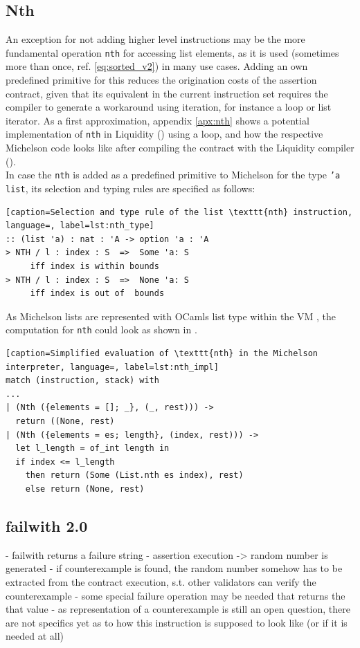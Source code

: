 \subsection{Nth}
An exception for not adding higher level instructions may be the more fundamental operation \texttt{nth} for accessing list elements, as it is used (sometimes more than once, ref. \eqref{eq:sorted_v2}) in many use cases. Adding an own predefined primitive for this reduces the origination costs of the assertion contract, given that its equivalent in the current instruction set requires the compiler to generate a workaround using iteration, for instance a loop or list iterator. As a first approximation, appendix \ref{apx:nth} shows a potential implementation of \texttt{nth} in Liquidity () using a loop, and how the respective Michelson code looks like after compiling the contract with the Liquidity compiler (). \\
In case the \texttt{nth} is added as a predefined primitive to Michelson for the type \texttt{'a list}, its selection and typing rules are specified as follows:
\begin{lstlisting}[caption=Selection and type rule of the list \texttt{nth} instruction, language=, label=lst:nth_type]
:: (list 'a) : nat : 'A -> option 'a : 'A
> NTH / l : index : S  =>  Some 'a: S
     iff index is within bounds
> NTH / l : index : S  =>  None 'a: S
     iff index is out of  bounds
\end{lstlisting}
As Michelson lists are represented with OCamls list type within the VM \cite{tezos_repo}, the computation for \texttt{nth} could look as shown in .
\begin{lstlisting}[caption=Simplified evaluation of \texttt{nth} in the Michelson interpreter, language=, label=lst:nth_impl]
match (instruction, stack) with
...
| (Nth ({elements = []; _}, (_, rest))) ->
  return ((None, rest)
| (Nth ({elements = es; length}, (index, rest))) ->
  let l_length = of_int length in
  if index <= l_length
    then return (Some (List.nth es index), rest)
    else return (None, rest)
\end{lstlisting}
\lstset{upquote=false}

\subsection{failwith 2.0}
\draft{}
- failwith returns a failure string
- assertion execution -> random number is generated
- if counterexample is found, the random number somehow has to be extracted from the contract execution, s.t. other validators can verify the counterexample
- some special failure operation may be needed that returns the that value
- as representation of a counterexample is still an open question, there are not specifics yet as to how this instruction is supposed to look like (or if it is needed at all)

